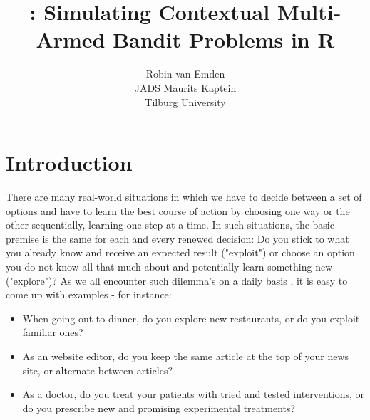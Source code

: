 \documentclass{jss}\usepackage[]{graphicx}\usepackage[]{color}
\author{Robin van Emden\\JADS \And
  Maurits Kaptein\\Tilburg University}
\title{\pkg{contextual}: Simulating Contextual Multi-Armed Bandit Problems in R}
\begin{document}
\sloppy








\section{Introduction}

There are many real-world situations in which we have to decide between a set of options and have to learn the best course of action by choosing one way or the other sequentially, learning one step at a time. In such situations, the basic premise is the same for each and every renewed decision: Do you stick to what you already know and receive an expected result ("exploit") or choose an option you do not know all that much about and potentially learn something new ("explore")? As we all encounter such dilemma's on a daily basis \citep{Wilson2014}, it is easy to come up with examples - for instance:

\begin{itemize}
\item When going out to dinner, do you explore new restaurants, or do you exploit familiar ones?
\item As an website editor, do you keep the same article at the top of your news site, or alternate between articles?
\item As a doctor, do you treat your patients with tried and tested interventions, or do you prescribe new and promising experimental treatments?
\end{itemize}
\end{document}
